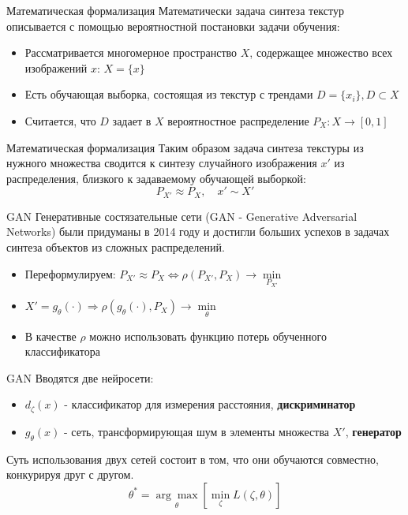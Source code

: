 \documentclass[12pt]{beamer}
\begin{document}
	\begin{frame}{Математическая формализация}
		Математически задача синтеза текстур описывается с помощью вероятностной постановки задачи обучения:
		\begin{itemize}
			\item Рассматривается многомерное пространство $X$, содержащее множество всех изображений $x$: $X = \{x\}$
			\item Есть обучающая выборка, состоящая из текстур с трендами $D = \{x_i\}, D \subset X$
			\item Считается, что  $D$ задает в $X$ вероятностное распределение $P_X : X \longrightarrow [0,1]$
		\end{itemize}
	\end{frame}
	
	\begin{frame}{Математическая формализация}
		Таким образом задача синтеза текстуры из нужного множества сводится к синтезу случайного изображения $x'$ из распределения, близкого к задаваемому обучающей выборкой:
		$$ P_{X'} \approx P_X, \quad x' \sim X'$$
	\end{frame}
	
	\begin{frame}{GAN}
		Генеративные состязательные сети (GAN - Generative Adversarial Networks) были придуманы в 2014 году и достигли больших успехов в задачах синтеза объектов из сложных распределений.
		\begin{itemize}
			\item Переформулируем: $ P_{X'} \approx P_X \Leftrightarrow \rho(P_{X'}, P_X) \longrightarrow \underset{P_{X'}}{\min} $
			\item $ X' = g_{\theta}(\cdot) \Rightarrow \rho(g_{\theta}(\cdot), P_X) \longrightarrow \underset{\theta}{\min}$
			\item В качестве $\rho$ можно использовать функцию потерь обученного классификатора
		\end{itemize}
	\end{frame}
	
	\begin{frame}{GAN}
		Вводятся две нейросети:
		\begin{itemize}
			\item $d_{\zeta}(x)$ - классификатор для измерения расстояния, \textbf{дискриминатор}
			\item $g_{\theta}(x)$ - сеть, трансформирующая шум в элементы множества $X'$, \textbf{генератор}
		\end{itemize}
		Суть использования двух сетей состоит в том, что они обучаются совместно, конкурируя друг с другом.
		$$ \theta^* = \underset{\theta}{\arg\max} \left[ \underset{\zeta}{\min} L(\zeta, \theta) \right] $$
	\end{frame}
	
\end{document}

